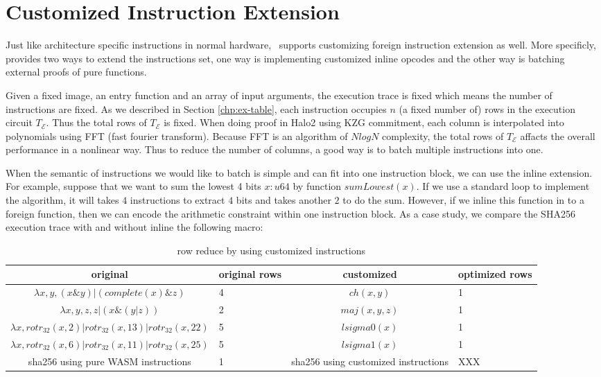 \section{Customized Instruction Extension}
\label{chp:foreign}
Just like architecture specific instructions in normal hardware, \zkwasm\, supports customizing foreign instruction extension as well. More specificly, \zkwasm\, provides two ways to extend the instructions set, one way is implementing customized inline opcodes and the other way is batching external proofs of pure functions.

Given a fixed image, an entry function and an array of input arguments, the execution trace is fixed which means the number of instructions are fixed. As we described in Section \ref{chp:ex-table}, each instruction occupies $n$ (a fixed number of) rows in the execution circuit $T_\mathcal{E}$. Thus the total rows of $T_\mathcal{E}$ is fixed. When doing proof in Halo2 using KZG commitment, each column is interpolated into polynomials using FFT (fast fourier transform). Because FFT is an algorithm of $NlogN$ complexity, the total rows of $T_\mathcal{E}$ affacts the overall performance in a nonlinear way. Thus to reduce the number of columns, a good way is to batch multiple instructions into one.

When the semantic of instructions we would like to batch is simple and can fit into one instruction block, we can use the inline extension. For example, suppose that we want to sum the lowest 4 bits $x:u64$ by function $sumLowest(x)$. If we use a standard loop to implement the algorithm, it will takes $4$ instructions to extract $4$ bits and takes another $2$ to do the sum. However, if we inline this function in to a foreign function, then we can encode the arithmetic constraint within one instruction block. As a case study, we compare the SHA256 execution trace with and without inline the following macro:

\begin{table}[!h]
\small
\begin{center}
\begin{tabular}{ | c | p{1cm} | c | p{1.5cm} | }
  \hline
  original & original rows & customized & optimized rows\\ 
  \hline
  $\lambda x, y, (x \& y) | (complete(x) \& z)$ & 4 & $ch(x,y)$ & 1 \\
  \hline
  $\lambda x, y, z, z | (x \& (y | z))$ & 2 & $maj(x, y, z)$ & 1\\
  \hline
  $\lambda x, rotr_{32}(x, 2) | rotr_{32}(x, 13) | rotr_{32}(x, 22)$ & 5 & $lsigma0(x)$ & 1 \\
  \hline
  $\lambda x, rotr_{32}(x, 6) | rotr_{32}(x, 11) | rotr_{32}(x, 25)$ & 5 & $lsigma1(x)$ & 1\\
 \hline
   sha256 using pure WASM instructions & 1 & sha256 using customized instructions & XXX\\
 \hline
\end{tabular}
\caption{row reduce by using customized instructions}
\label{tbl:memory-instruction}
\end{center}
\end{table}

